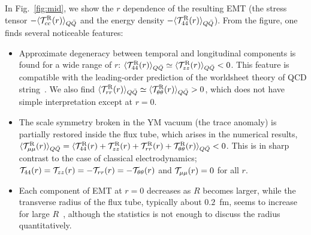 \documentclass[3p,twocolumn,sort&compress]{elsarticle}
\begin{document}
In Fig.~\ref{fig:mid}, we show the $r$ dependence of the resulting EMT
(the stress tensor  $ - \langle {\cal T}^{\rm R}_{cc}(r) \rangle_{Q\bar{Q}} $ and the
energy density  $-\langle {\cal T}^{\rm R}_{44}(r)\rangle_{Q\bar{Q}} $).
From the figure, one finds several noticeable features:
\begin{itemize}
\item[(i)] Approximate degeneracy between  temporal and longitudinal components 
is found for a wide range of $r$:  
$ \langle {\cal T}^{\rm R}_{44}(r)  \rangle_{Q\bar{Q}}  \simeq
\langle {\cal T}^{\rm R}_{zz}(r) \rangle_{Q\bar{Q}} < 0 $.  This feature is compatible with the
 leading-order prediction of the worldsheet theory of QCD string~\cite{Meyer:2010tw}.
We also find 
$ \langle {\cal T}^{\rm R}_{rr}(r)  \rangle_{Q\bar{Q}}  \simeq
\langle{\cal T}^{\rm R}_{\theta \theta}(r)  \rangle_{Q\bar{Q}} >0  $, which 
does not have simple interpretation except at $r=0$.

\item[(ii)] The scale symmetry broken in the YM vacuum (the trace anomaly) is
partially restored inside the flux tube, which arises in the numerical results,
$ \langle {\cal T}^{\rm R}_{\mu \mu}(r) \rangle_{Q\bar{Q}} =
\langle {\cal T}^{\rm R}_{44}(r) +  {\cal T}^{\rm R}_{zz}(r) +
{\cal T}^{\rm R}_{rr}(r)  +  {\cal T}^{\rm R}_{\theta \theta}(r) \rangle_{Q\bar{Q}} <  0 $.
This is in sharp  contrast to  the case of classical electrodynamics;
 ${\cal T}_{44}(r)={\cal T}_{zz}(r)=-{\cal T}_{rr}(r)=
-{\cal T}_{\theta \theta}(r)$ and    ${\cal T}_{\mu \mu}(r)=0$ for all $r$.
\item[(iii)] Each component of EMT at $r=0$ decreases as
  $R$ becomes larger, while the transverse radius of the flux tube,
  typically about $0.2$~fm, seems to increase for large $R$~\cite{Cardoso:2013lla,Luscher:1981,Gliozzi:2010zv},
  although the statistics is not enough to discuss
  the radius quantitatively.
 \end{itemize} 
\end{document}
